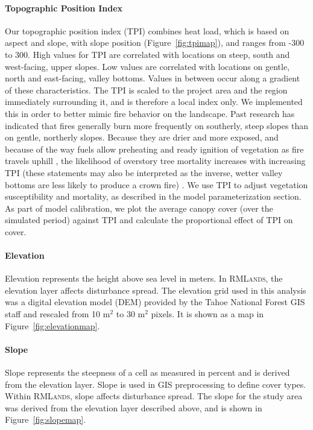 \paragraph{Topographic Position Index}
Our topographic position index (TPI) combines heat load, which is based on aspect and slope, with slope position (Figure~\ref{fig:tpimap}), and ranges from -300 to 300. High values for TPI are correlated with locations on steep, south and west-facing, upper slopes. Low values are correlated with locations on gentle, north and east-facing, valley bottoms. Values in between occur along a gradient of these characteristics. The TPI is scaled to the project area and the region immediately surrounding it, and is therefore a local index only. We implemented this in order to better mimic fire behavior on the landscape. Past research has indicated that fires generally burn more frequently on southerly, steep slopes than on gentle, northerly slopes. Because they are drier and more exposed, and because of the way fuels allow preheating and ready ignition of vegetation as fire travels uphill \citep{Rothermel1983}, the likelihood of overstory tree mortality increases with increasing TPI (these statements may also be interpreted as the inverse, wetter valley bottoms are less likely to produce a crown fire) \citep{North2012,Taylor2003a,}. We use TPI to adjust vegetation susceptibility and mortality, as described in the model parameterization section. As part of model calibration, we plot the average canopy cover (over the simulated period) against TPI and calculate the proportional effect of TPI on cover.



\paragraph{Elevation} 
Elevation represents the height above sea level in meters. In \textsc{RMLands}, the elevation layer affects disturbance spread. The elevation grid used in this analysis was a digital elevation model (DEM) provided by the Tahoe National Forest GIS staff and rescaled from 10 m$^2$ to 30 m$^2$ pixels. It is shown as a map in Figure~\ref{fig:elevationmap}.



\paragraph{Slope} 
Slope represents the steepness of a cell as measured in percent and is derived from the elevation layer. Slope is used in GIS preprocessing to define cover types. Within \textsc{RMLands}, slope affects disturbance spread. The slope for the study area was derived from the elevation layer described above, and is shown in Figure~\ref{fig:slopemap}.


